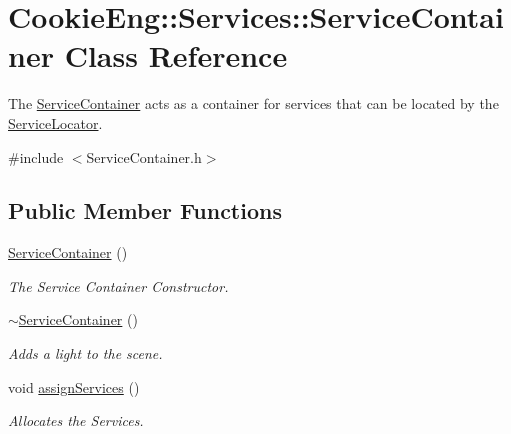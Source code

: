 \hypertarget{class_cookie_eng_1_1_services_1_1_service_container}{}\section{Cookie\+Eng\+:\+:Services\+:\+:Service\+Container Class Reference}
\label{class_cookie_eng_1_1_services_1_1_service_container}


The \hyperlink{class_cookie_eng_1_1_services_1_1_service_container}{Service\+Container} acts as a container for services that can be located by the \hyperlink{class_cookie_eng_1_1_services_1_1_service_locator}{Service\+Locator}.  




{\ttfamily \#include $<$Service\+Container.\+h$>$}

\subsection*{Public Member Functions}
\begin{DoxyCompactItemize}
\item 
\hyperlink{class_cookie_eng_1_1_services_1_1_service_container_a6d91b2942fd8e169641b5e723ec0e999}{Service\+Container} ()
\begin{DoxyCompactList}\small\item\em The Service Container Constructor. \end{DoxyCompactList}\item 
\hyperlink{class_cookie_eng_1_1_services_1_1_service_container_aee981da4b22b806f868cc6df3e2762af}{$\sim$\+Service\+Container} ()
\begin{DoxyCompactList}\small\item\em Adds a light to the scene. \end{DoxyCompactList}\item 
void \hyperlink{class_cookie_eng_1_1_services_1_1_service_container_a97ec731de9af553fd503f3d9c81522a0}{assign\+Services} ()
\begin{DoxyCompactList}\small\item\em Allocates the Services. \end{DoxyCompactList}\end{DoxyCompactItemize}
